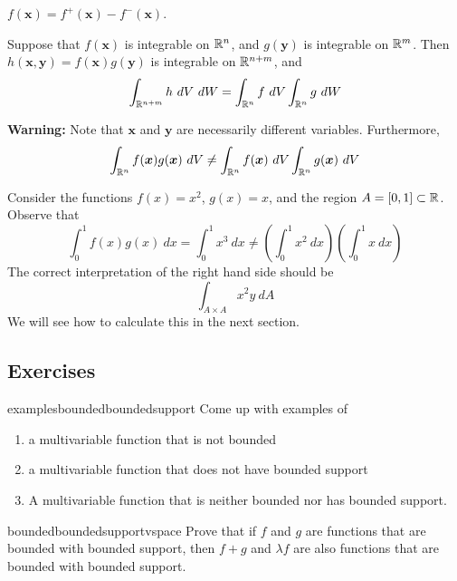     \begin{proposition}
    $f(\bm{x}) = f^+(\bm{x}) - f^-(\bm{x})$.
    \end{proposition}


    \begin{proposition}
    Suppose that $f(\bm{x})$ is integrable on $\mathbb{R}^n$, and $g(\bm{y})$ is integrable on $\mathbb{R}^m$.  Then $h(\bm{x},\bm{y}) = f(\bm{x})g(\bm{y})$ is integrable on $\mathbb{R}^{n+m}$, and 
    $$\int_{\mathbb{R}^{n+m}} h \ dV \ dW = \int_{\mathbb{R}^n} f \ dV \int_{\mathbb{R}^n} g \ dW$$
    \end{proposition}
    
    \begin{remark}
        \textbf{Warning:} Note that $\bm{x}$ and $\bm{y}$ are necessarily different variables.  Furthermore, $$\int_{\mathbb{R}^{n}} f(\bm{x})g(\bm{x}) \ dV \neq \int_{\mathbb{R}^n} f(\bm{x}) \ dV \int_{\mathbb{R}^n} g(\bm{x}) \ dV$$
    \end{remark}

    \begin{example}
        Consider the functions $f(x) = x^2$, $g(x) = x$, and the region $A = [0,1] \subset \mathbb{R}$.  Observe that $$\int_0^1 f(x)g(x) \ dx = \int_0^1 x^3 \ dx \neq \left(\int_0^1 x^2 \ dx\right)\left(\int_0^1 x \ dx\right)$$
        The correct interpretation of the right hand side should be 
        $$\int_{A \times A} x^2y \ dA$$
        We will see how to calculate this in the next section.
    \end{example}
    
\subsection{Exercises}

\begin{problem}{examplesboundedboundedsupport}
Come up with examples of
       \begin{enumerate}
           \item a multivariable function that is not bounded
           \item a multivariable function that does not have bounded support
           \item A multivariable function that is neither bounded nor has bounded support.
       \end{enumerate}
\end{problem}

\begin{problem}{boundedboundedsupportvspace}
    Prove that if $f$ and $g$ are functions that are bounded with bounded support, then $f+g$ and $\lambda f$ are also functions that are bounded with bounded support.
\end{problem}

